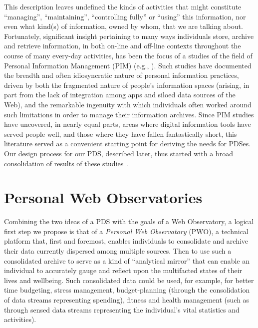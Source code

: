\documentclass{sig-alternate}
\begin{document}
This description leaves undefined the kinds of activities that might constitute ``managing'', ``maintaining'', ``controlling fully'' or ``using'' this information, nor even what kind(s) of information, owned by whom, that we are talking about. Fortunately, significant insight pertaining to many ways individuals store, archive and retrieve information, in both on-line and off-line contexts throughout the course of many every-day activities, has been the focus of a studies of the field of Personal Information Management (PIM) (e.g., \cite{sellen2003myth,bernstein2008information,van2011finders}).  Such studies have documented the breadth and often idiosyncratic nature of personal information practices, driven by both the fragmented nature of people's information spaces (arising, in part from the lack of integration among apps and siloed data sources of the Web), and the remarkable ingenuity with which individuals often worked around such limitations in order to manage their information archives.  Since PIM studies have uncovered, in nearly equal parts, areas where digital information tools have served people well, and those where they have fallen fantastically short, this literature served as a convenient starting point for deriving the needs for PDSes.  Our design process for our PDS, described later, thus started with a broad consolidation of results of these studies~\cite{van2012decentralized}.  

\section{Personal Web Observatories}

Combining the two ideas of a PDS with the goals of a Web Observatory, a logical first step we propose is that of a \emph{Personal Web Observatory} (PWO), a technical platform that, first and foremost, enables individuals to consolidate and archive their data currently dispersed among multiple sources. Then to use such a consolidated archive to serve as a kind of ``analytical mirror'' that can enable an individual to accurately gauge and reflect upon the multifacted states of their lives and wellbeing. Such consolidated data could be used, for example, for better time budgeting, stress management, budget-planning (through the consolidation of data streams representing spending), fitness and health management (such as through sensed data streams representing the individual's vital statistics and activities). 
\end{document}
